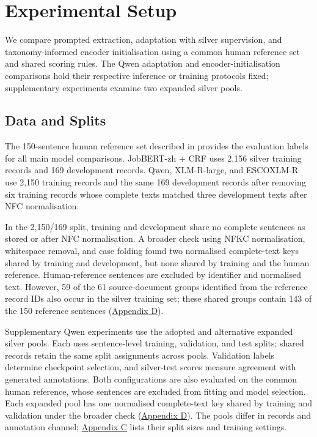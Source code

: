 \section{Experimental Setup}
\label{sec:experiments}

We compare prompted extraction, adaptation with silver supervision, and taxonomy-informed encoder initialisation using a common human reference set and shared scoring rules. The Qwen adaptation and encoder-initialisation comparisons hold their respective inference or training protocols fixed; supplementary experiments examine two expanded silver pools.

\subsection{Data and Splits}

The 150-sentence human reference set described in  provides the evaluation labels for all main model comparisons. JobBERT-zh + CRF uses 2,156 silver training records and 169 development records. Qwen, XLM-R-large, and ESCOXLM-R use 2,150 training records and the same 169 development records after removing six training records whose complete texts matched three development texts after NFC normalisation.

In the 2,150/169 split, training and development share no complete sentences as stored or after NFC normalisation. A broader check using NFKC normalisation, whitespace removal, and case folding found two normalised complete-text keys shared by training and development, but none shared by training and the human reference. Human-reference sentences are excluded by identifier and normalised text. However, 59 of the 61 source-document groups identified from the reference record IDs also occur in the silver training set; these shared groups contain 143 of the 150 reference sentences (\hyperref[app:d]{Appendix D}).

Supplementary Qwen experiments use the adopted and alternative expanded silver pools. Each uses sentence-level training, validation, and test splits; shared records retain the same split assignments across pools. Validation labels determine checkpoint selection, and silver-test scores measure agreement with generated annotations. Both configurations are also evaluated on the common human reference, whose sentences are excluded from fitting and model selection. Each expanded pool has one normalised complete-text key shared by training and validation under the broader check (\hyperref[app:d]{Appendix D}). The pools differ in records and annotation channel; \hyperref[app:c]{Appendix C} lists their split sizes and training settings.

